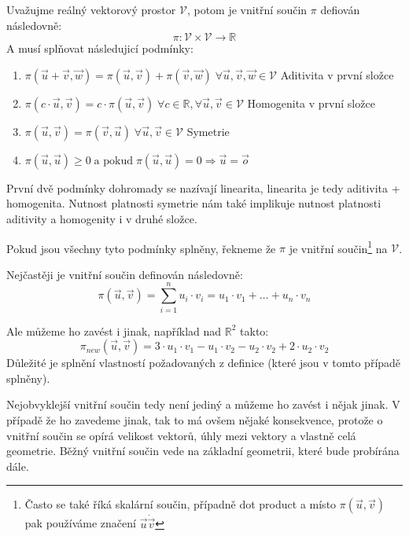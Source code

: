 \begin{definition}
    Uvažujme reálný vektorový prostor $\mathcal{V}$, potom je vnitřní součin $\pi$ defiován následovně:
    $$\pi: \mathcal{V} \times \mathcal{V} \rightarrow \mathbb{R}$$
    A musí splňovat následujicí podmínky:
    \begin{enumerate}
        \item $\pi(\vec{u} + \vec{v}, \vec{w}) = \pi(\vec{u}, \vec{v}) + \pi(\vec{v}, \vec{w})\;
        \forall \vec{u}, \vec{v}, \vec{w} \in \mathcal{V}$ \hfill Aditivita v první složce

        \item $\pi(c \cdot \vec{u}, \vec{v}) = c \cdot \pi(\vec{u}, \vec{v})\; \forall c\in \mathbb{R},
        \forall \vec{u}, \vec{v} \in \mathcal{V}$ \hfill Homogenita v první složce

        \item $\pi(\vec{u}, \vec{v}) = \pi(\vec{v}, \vec{u})\;
        \forall \vec{u}, \vec{v} \in \mathcal{V}$ \hfill Symetrie

        \item $\pi(\vec{u}, \vec{u}) \geq 0\;\text{a pokud}\; \pi(\vec{u}, \vec{u}) = 0 \Rightarrow \vec{u} = \vec{o}$
    \end{enumerate}
    První dvě podmínky dohromady se nazívají linearita, linearita je tedy aditivita + homogenita. Nutnost platnosti
    symetrie nám také implikuje nutnost platnosti aditivity a homogenity i v druhé složce.

    Pokud jsou všechny tyto podmínky splněny, řekneme že $\pi$ je vnitřní součin\footnote{Často se také říká
    skalární součin, případně dot product a místo $\pi(\vec{u}, \vec{v})$ pak používáme
    značení $\vec{u} \dot \vec{v}$} na $\mathcal{V}$.
\end{definition}

Nejčastěji je vnitřní součin definován následovně:
$$\pi(\vec{u}, \vec{v}) = \sum_{i=1}^n u_i \cdot v_i = u_1 \cdot v_1 + \ldots + u_n \cdot v_n$$

Ale můžeme ho zavést i jinak, například nad $\mathbb{R}^2$ takto:
$$\pi_{new}(\vec{u}, \vec{v}) = 3\cdot u_1 \cdot v_1 - u_1 \cdot v_2 - u_2 \cdot v_2 + 2 \cdot u_2 \cdot v_2$$
Důležité je splnění vlastností požadovaných z definice (které jsou v tomto případě splněny).

Nejobvyklejší vnitřní součin tedy není jediný a můžeme ho zavést i nějak jinak. V případě že ho zavedeme jinak,
tak to má ovšem nějaké konsekvence, protože o vnitřní součin se opírá velikost vektorů, úhly mezi vektory a
vlastně celá geometrie. Běžný vnitřní součin vede na základní  geometrii, které bude probírána
dále.

